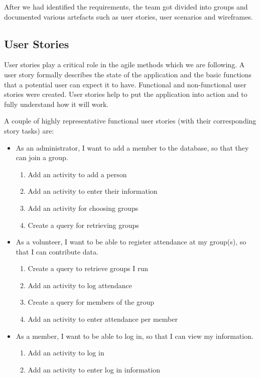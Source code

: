 \documentclass{l3proj}
\begin{document}
After we had identified the requirements, the team got divided into groups and documented various artefacts such as user stories, user scenarios and wireframes.

\subsection{User Stories}
\label{user_stories}

User stories \cite{UserStories} play a critical role in the agile methods which we are following. A user story formally describes the state of the application and the basic functions that a potential user can expect it to have. Functional and non-functional user stories were created. User stories help to put the application into action and to fully understand how it will work.

A couple of highly representative functional user stories (with their corresponding story tasks) are:
\begin{itemize}
\item As an administrator, I want to add a member to the database, so that they can join a group.

	\begin{enumerate}
	\item Add an activity to add a person
	\item Add an activity to enter their information
	\item Add an activity for choosing groups
	\item Create a query for retrieving groups
	\end{enumerate}

\item As a volunteer, I want to be able to register attendance at my group(s), so that I can contribute data.

	\begin{enumerate}
	\item Create a query to retrieve groups I run
	\item Add an activity to log attendance
	\item Create a query for members of the group
	\item Add an activity to enter attendance per member
	\end{enumerate}

\item As a member, I want to be able to log in, so that I can view my information.

	\begin{enumerate}
	\item Add an activity to log in
	\item Add an activity to enter log in information
	\end{enumerate}
\end{itemize}
\end{document}
